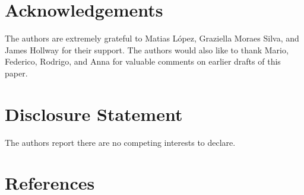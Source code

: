 \documentclass[
  12pt,
]{article}
\begin{document}
\hypertarget{acknowledgements}{%
\section{Acknowledgements}\label{acknowledgements}}

The authors are extremely grateful to Matias López, Graziella Moraes
Silva, and James Hollway for their support. The authors would also like
to thank Mario, Federico, Rodrigo, and Anna for valuable comments on
earlier drafts of this paper.

\hypertarget{disclosure-statement}{%
\section{Disclosure Statement}\label{disclosure-statement}}

The authors report there are no competing interests to declare.

\hypertarget{references}{%
\section{References}\label{references}}
\end{document}
